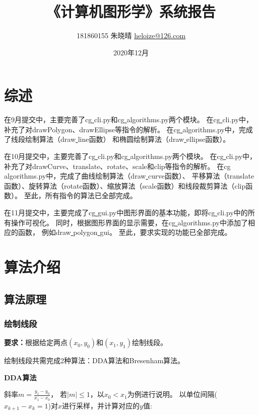 \documentclass[a4paper,UTF8]{article}
\begin{document}
\title{《计算机图形学》系统报告}
\author{181860155 朱晓晴 \href{mailto:heloize@126.com}{heloize@126.com}}
\date{2020年12月}
\maketitle

\section{综述}
在9月提交中，主要完善了cg\underline{ }cli.py和cg\underline{ }algorithms.py两个模块。
在cg\underline{ }cli.py中，补充了对drawPolygon、drawEllipse等指令的解析。
在cg\underline{ }algorithms.py中，完成了线段绘制算法（draw\underline{ }line函数）
和椭圆绘制算法（draw\underline{ }ellipse函数）。

在10月提交中，主要完善了cg\underline{ }cli.py和cg\underline{ }algorithms.py两个模块。
在cg\underline{ }cli.py中，补充了对drawCurve、translate、rotate、scale和clip等指令的解析。
在cg\underline{ }algorithms.py中，完成了曲线绘制算法（draw\underline{ }curve函数）、
平移算法（translate函数）、旋转算法（rotate函数）、缩放算法（scale函数）和线段裁剪算法（clip函数）。
至此，所有指令的算法已全部完成。

在11月提交中，主要完成了cg\underline{ }gui.py中图形界面的基本功能，即将cg\underline{ }cli.py中的所有操作可视化。
同时，根据图形界面的显示需要，在cg\underline{ }algorithms.py中添加了相应的函数，
例如draw\underline{ }polygon\underline{ }gui。
至此，要求实现的功能已全部完成。


\section{算法介绍}
\subsection{算法原理}
\subsubsection{绘制线段}
\textbf{要求：}根据给定两点$(x_0,y_0)$和$(x_1,y_1)$绘制线段。

绘制线段共需完成2种算法：DDA算法和Bresenham算法。

\textbf{DDA算法}

斜率$m=\frac{y_1-y_0}{x_1-x_0}$，
若$|m|\leqslant 1$，以$x_0<x_1$为例进行说明。
以单位间隔($x_{k+1}-x_k=1$)对$x$进行采样，并计算对应的$y$值:
\end{document}
